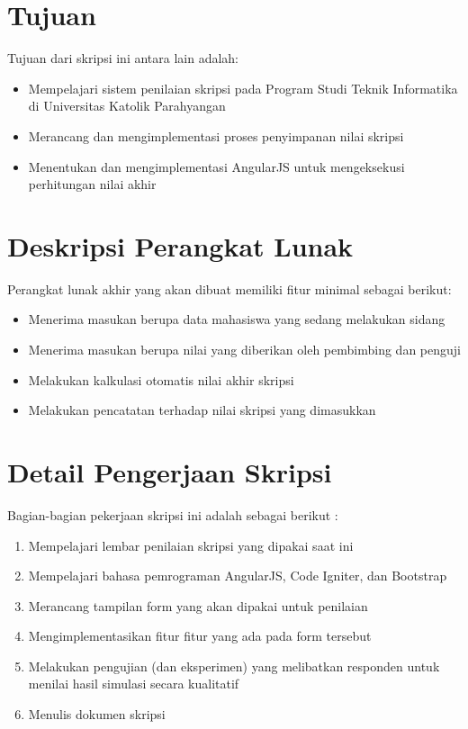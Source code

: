 \documentclass[a4paper,twoside]{article}
\begin{document}
\section{Tujuan}
Tujuan dari skripsi ini antara lain adalah:
\begin{itemize}
	\item Mempelajari sistem penilaian skripsi pada Program Studi Teknik Informatika di Universitas Katolik Parahyangan
	\item Merancang dan mengimplementasi proses penyimpanan nilai skripsi
	\item Menentukan dan mengimplementasi AngularJS untuk mengeksekusi perhitungan nilai akhir
\end{itemize}

\section{Deskripsi Perangkat Lunak}
Perangkat lunak akhir yang akan dibuat memiliki fitur minimal sebagai berikut:
\begin{itemize}
	\item Menerima masukan berupa data mahasiswa yang sedang melakukan sidang
	\item Menerima masukan berupa nilai yang diberikan oleh pembimbing dan penguji
	\item Melakukan kalkulasi otomatis nilai akhir skripsi
	\item Melakukan pencatatan terhadap nilai skripsi yang dimasukkan
\end{itemize}

\section{Detail Pengerjaan Skripsi}
Bagian-bagian pekerjaan skripsi ini adalah sebagai berikut :
	\begin{enumerate}
		\item Mempelajari lembar penilaian skripsi yang dipakai saat ini
		\item Mempelajari bahasa pemrograman AngularJS, Code Igniter, dan Bootstrap
		\item Merancang tampilan form yang akan dipakai untuk penilaian
		\item Mengimplementasikan fitur fitur yang ada pada form tersebut
		\item Melakukan pengujian (dan eksperimen) yang melibatkan responden untuk menilai hasil simulasi secara kualitatif
		\item Menulis dokumen skripsi
	\end{enumerate}
\end{document}
